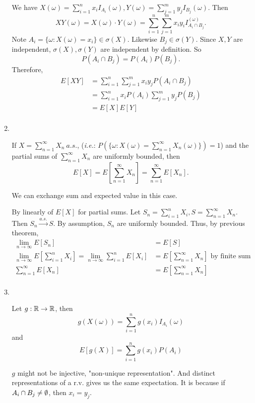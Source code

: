 \documentclass[class=article,crop=false]{standalone}
\begin{document}
\begin{claim}[]
\begin{enumerate}[label=\arabic*)]
\begin{prf}
We have $ X(\omega) = \sum_{ i= 1}^{ n} x_i I_{A_i}(\omega), Y(\omega)= \sum_{ j= 1}^{ m} y_j I_{B_j}(\omega)$. Then
\[
	XY(\omega)=X(\omega) \cdot Y(\omega)=\sum_{ i= 1}^{ n} \sum_{ j= 1}^{ m} x_i y_i I_{A_i \cap  B_j}^{(\omega)}
.\]
Note $ A_i = \{\omega:X(\omega) = x_i\} \in \sigma(X)$. Likewise $ B_j \in \sigma(Y)$. Since $ X,Y$ are independent,  $ \sigma(X), \sigma(Y)$ are independent by definition. So
\[
	P(A_i \cap  B_j) = P(A_i)P(B_j)
.\] 
Therefore,
\begin{align*}
	E[XY] &= \sum_{ i= 1}^{ n} \sum_{ j= 1}^{ m} x_i y_j P(A_i \cap B_j) \\
	      &= \sum_{ i= 1}^{ n} x_i P(A_i) \sum_{ j= 1}^{ m} y_j P(B_j) \\
	      &= E[X] E[Y]\\
\end{align*}
\end{prf}
\item
~\begin{thm}[]
	If $ X=\sum_{ n= 1}^{\infty} X_n \ a.s.$, (\emph{i.e.}: $ P(\{\omega:X(\omega)=\sum_{ n= 1}^{\infty} X_n(\omega)\} ) =1$) and the partial sums of $ \sum_{ n= 1}^{\infty} X_n$ are uniformly bounded, then
	\[
		E[X]=E\left[ \sum_{ n= 1}^{\infty} X_n \right] = \sum_{ n= 1}^{\infty} E[X_n]
	.\] 
\end{thm}
\begin{note}[]
We can exchange sum and expected value in this case.
\end{note}
\begin{prf}
	By linearly of $ E[X]$ for partial sums. Let $ S_n = \sum_{ i= 1}^{ n} X_i, S= \sum_{ n= 1}^{\infty} X_n$. Then $ S_n \xrightarrow{ a.s.} S $. By assumption, $ S_n$ are uniformly bounded. Thus, by previous theorem,
	\begin{align*}
		\lim_{ n \to \infty} E[S_n] &= E[S]\\
		\lim_{ n \to \infty} E\left[ \sum_{ i= 1}^{ n} X_i \right] = \lim_{ n \to \infty} \sum_{ i= 1}^{ n} E[X_i] &= E\left[ \sum_{ n= 1}^{\infty} X_n \right] \text{ by finite sum}  \\
		\sum_{ n= 1}^{\infty} E[X_n]&= E\left[ \sum_{ n= 1}^{\infty} X_n \right]  \\
	\end{align*} 
\end{prf}
\item
~\begin{thm}[]
	Let $ g: \mathbb{R} \to \mathbb{R}$, then \[ g(X(\omega))= \sum_{ i= 1}^{ n} g(x_i) I_{A_i}(\omega)\] and \[E[g(X)] = \sum_{ i= 1}^{ n} g(x_i)P(A_i)\]
\end{thm}
\begin{note}[]
$ g$ might not be injective, "non-unique representation". And distinct representations of a r.v. gives us the same expectation. It is because if $ A_i \cap  B_j \neq \emptyset$, then $ x_i = y_j$.
\end{note}


\end{enumerate}
\end{claim}
\end{document}
